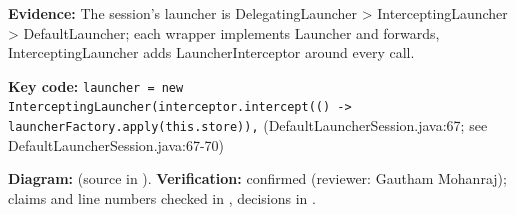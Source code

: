 \documentclass[11pt,a4paper]{article}
\begin{document}
\textbf{Evidence:} The session's launcher is DelegatingLauncher \textgreater{} InterceptingLauncher \textgreater{} DefaultLauncher; each wrapper implements Launcher and forwards, InterceptingLauncher adds LauncherInterceptor around every call.\par
\textbf{Key code:} \texttt{launcher = new Intercepting\allowbreak{}Launcher(interceptor.\allowbreak{}intercept(() -\textgreater{} launcher\allowbreak{}Factory.\allowbreak{}apply(this.\allowbreak{}store)),} (DefaultLauncherSession.java:67; see DefaultLauncherSession.java:67-70)\par
\textbf{Diagram:}  (source in ). \textbf{Verification:} confirmed (reviewer: Gautham Mohanraj); claims and line numbers checked in , decisions in .\par
\end{document}
